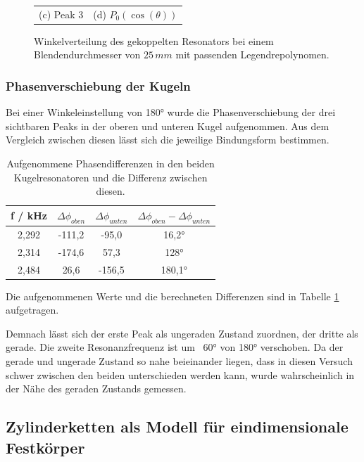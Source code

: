 \begin{figure}[H]
\begin{tabular}{cc}
  (c)  Peak 3 & (d)  $P_0(\cos(\theta))$ \\[6pt]
  \end{tabular}
  \caption{Winkelverteilung des gekoppelten Resonators bei einem Blendendurchmesser von $25\, mm$ mit passenden Legendrepolynomen.} 
  \label{fig:h2_2}
\end{figure}

\subsubsection{Phasenverschiebung der Kugeln}

Bei einer Winkeleinstellung von 180° wurde die Phasenverschiebung der drei sichtbaren Peaks in der oberen und unteren Kugel aufgenommen. Aus dem Vergleich zwischen diesen lässt sich die jeweilige Bindungsform bestimmen. 
\begin{table}[H]
  \centering
\begin{tabular}{c|c|c|c}
  f / kHz & $\Delta\phi_{oben}$ & $\Delta\phi_{unten}$ &  $\Delta\phi_{oben}-\Delta\phi_{unten}$ \\ \hline
  2,292 & -111,2 & -95,0 & 16,2° \\
  2,314 & -174,6 & 57,3 & 128° \\
  2,484 & 26,6 & -156,5 &  180,1° \\
\end{tabular}
\caption{Aufgenommene Phasendifferenzen in den beiden Kugelresonatoren und die Differenz zwischen diesen.} 
\label{tab:phasen}
\end{table}
Die aufgenommenen Werte und die berechneten Differenzen sind in Tabelle \ref{tab:phasen} aufgetragen.

Demnach lässt sich der erste Peak als ungeraden Zustand zuordnen, der dritte als gerade. 
Die zweite Resonanzfrequenz ist um ~60° von 180° verschoben. Da der gerade und ungerade Zustand so nahe beieinander liegen, dass in diesen Versuch schwer zwischen den beiden unterschieden werden kann, wurde wahrscheinlich in der Nähe des geraden Zustands gemessen.


\subsection{Zylinderketten als Modell für eindimensionale Festkörper}
